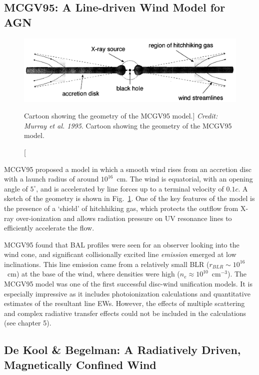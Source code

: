 \subsection{MCGV95: A Line-driven Wind Model for AGN}

\begin{figure}
\centering
\includegraphics[width=1.0\textwidth]{figures/02-outflows/MCGV95.png}
\caption
[Cartoon showing the geometry of the MCGV95 model.]
{
{\sl Credit: Murray et al. 1995}. 
Cartoon showing the geometry of the MCGV95 model.
} 
\label{fig:MCGV95}
\end{figure}
MCGV95 proposed a model in which a smooth wind rises from an accretion disc with a launch
radius of around $10^{16}$~cm. The wind is equatorial, with an opening angle
of $5^\circ$, and is accelerated by line forces up to a terminal velocity of $0.1c$.
A sketch of the geometry is shown in Fig.~\ref{fig:MCGV95}.
One of the key features of the model is the presence of a `shield' of hitchhiking
gas, which protects the outflow from X-ray over-ionization 
and allows radiation pressure on UV resonance lines to efficiently 
accelerate the flow. 

MCGV95 found that BAL profiles were
seen for an observer looking into the wind cone, and significant collisionally excited
line {\em emission} emerged at low inclinations. This line emission came
from a relatively small BLR ($r_{BLR} \sim10^{16}$~cm) at the base of the wind, 
where densities were high ($n_e \approx 10^{10}$~cm$^{-3}$). 
The MCGV95 model was one of the first successful disc-wind unification models.
It is especially impressive as it includes photoionization calculations and 
quantitative estimates of the resultant line EWs. However, the effects of multiple
scattering and complex radiative transfer effects could not be included 
in the calculations (see chapter 5).

\subsection{De Kool \& Begelman: A Radiatively Driven, Magnetically Confined Wind}

